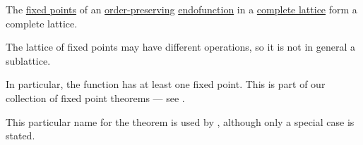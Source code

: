 \begin{theorem}\label{thm:knaster_tarski_theorem}
  The \hyperref[def:function_fixed_point]{fixed points} of an \hyperref[def:order_function]{order-preserving} \hyperref[def:endofunction]{endofunction} in a \hyperref[def:complete_lattice]{complete lattice} form a complete lattice.
\end{theorem}
\begin{comments}
  \item The lattice of fixed points may have different operations, so it is not in general a sublattice.

  \item In particular, the function has at least one fixed point. This is part of our collection of fixed point theorems --- see .

  \item This particular name for the theorem is used by \textcite[50]{DaveyPriestley2002LatticeTheory}, although only a special case is stated.
\end{comments}
